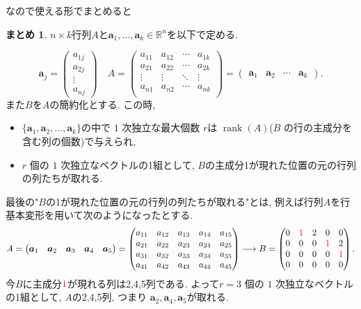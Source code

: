 \documentclass[dvipdfmx,a4paper,11pt]{article} %
\newcommand{\R}{\mathbb{R}}
\newcommand{\xr}[1]{\textcolor{red}{#1}}
\theoremstyle{definition}
\newtheorem{suma}[thm]{まとめ}
\begin{document}
なので使える形でまとめると
\begin{suma}
\label{suma-M-4.3-1}
  $n \times k$行列$A$と$\bm{a}_1, \ldots, \bm{a}_k \in  \R^n$を以下で定める.
    
    $$
    \bm{a}_j=
    \begin{pmatrix}
    a_{1j}\\a_{2j}\\\vdots\\a_{nj}
    \end{pmatrix}
    \quad
     A=\begin{pmatrix}
a_{11}& a_{12} & \cdots &a_{1k} \\
a_{21}& a_{22} & \cdots &a_{2k} \\
\vdots& \vdots	&	\ddots   &	\vdots \\
a_{n1}& a_{n2} & \cdots &a_{nk} \\
\end{pmatrix}
=
    \begin{pmatrix}
    \bm{a}_1&\bm{a}_2&\cdots&\bm{a}_k
    \end{pmatrix}.
$$
また$B$を$A$の簡約化とする. 
この時, 
\begin{itemize}
\item $\{ \bm{a}_1,  \bm{a}_2, \ldots, \bm{a}_k\}$の中で \(1\) 次独立な最大個数 \(r\)は
$\operatorname{rank}(A)$($B$ の行の主成分を含む列の個数)で与えられ, 
\item \(r\) 個の \(1\) 次独立なベクトルの1組として, $B$の主成分1が現れた位置の元の行列の列たちが取れる.
\end{itemize}
\end{suma}
最後の"$B$の1が現れた位置の元の行列の列たちが取れる"とは, 例えば行列$A$を行基本変形を用いて次のようになったとする.
$$
A=
    \begin{pmatrix}
    \bm{a}_1&\bm{a}_2&\bm{a}_3&\bm{a}_4&\bm{a}_5
    \end{pmatrix}
   =
\begin{pmatrix}
a_{11}& a_{12} &a_{13}& a_{14} & a_{15}  \\
a_{21}& a_{22} & a_{23}& a_{24} & a_{25}   \\
a_{31}& a_{32} &a_{33}& a_{34} & a_{35}  \\
a_{41}& a_{42} &a_{43}& a_{44} & a_{45}  \\
\end{pmatrix}
\longrightarrow 
B=
\begin{pmatrix}
0& \xr{1}& 2& 0 & 0   \\
0& 0 &0&\xr{1}&2 \\
0& 0 &0& 0&\xr{1}  \\
0& 0&0& 0& 0 \\
\end{pmatrix}.
$$
今$B$に主成分$\xr{1}$が現れる列は2,4,5列である.
よって\(r=3\) 個の \(1\) 次独立なベクトルの1組として, $A$の2,4,5列, つまり
$\bm{a}_2, \bm{a}_4, \bm{a}_5$が取れる. 
\end{document}
